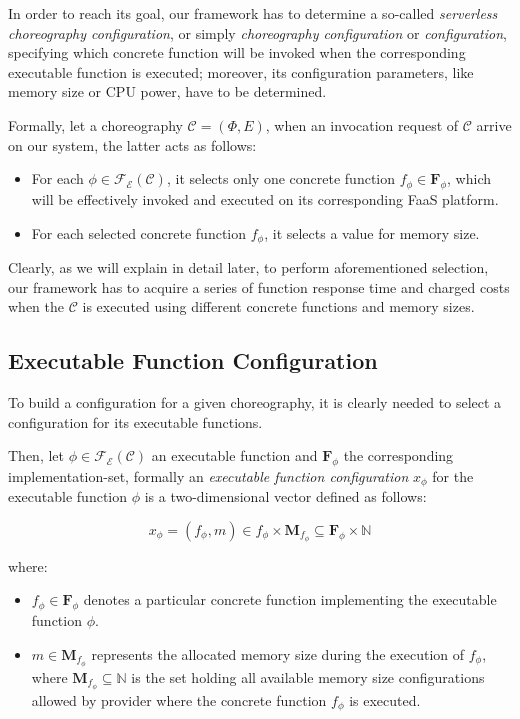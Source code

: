 \documentclass[12pt,a4paper]{report}
\newcommand{\N}{\mathbb{N}}
\begin{document}
In order to reach its goal, our framework has to determine a so-called \textit{serverless choreography configuration}, or simply \textit{choreography configuration} or \textit{configuration}, specifying which concrete function will be invoked when the corresponding executable function is executed; moreover, its configuration parameters, like memory size or CPU power, have to be determined.

Formally, let a choreography $\mathcal{C} = (\Phi,E)$, when an invocation request of $\mathcal{C}$ arrive on our system, the latter acts as follows:

\begin{itemize}
	\item For each $\phi \in \mathscr{F_E}(\mathcal{C})$, it selects only one concrete function $f_{\phi} \in \textbf{F}_{\phi}$, which will be effectively invoked and executed on its corresponding FaaS platform. 
	\item For each selected concrete function $f_{\phi}$, it selects a value for memory size.
\end{itemize}

Clearly, as we will explain in detail later, to perform aforementioned selection, our framework has to acquire a series of function response time and charged costs when the $\mathcal{C}$ is executed using different concrete functions and memory sizes.  

\subsection{Executable Function Configuration}

To build a configuration for a given choreography, it is clearly needed to select a configuration for its executable functions. 

Then, let $\phi \in \mathscr{F_E}(\mathcal{C})$ an executable function and $\textbf{F}_{\phi}$ the corresponding implementation-set, formally an \textit{executable function configuration} $x_{\phi}$ for the executable function $\phi$ is a two-dimensional vector defined as follows:

\begin{equation}
	x_{\phi} = (f_{\phi},m) \in f_{\phi} \times \textbf{M}_{f_{\phi}} \subseteq \textbf{F}_{\phi} \times \N
\end{equation}

where:

\begin{itemize}
	\item $f_{\phi} \in \textbf{F}_{\phi}$  denotes a particular concrete function implementing the executable function $\phi$.
	\item $m \in \textbf{M}_{f_{\phi}}$ represents the allocated memory size during the execution of $f_{\phi}$, where $\textbf{M}_{f_{\phi}} \subseteq \N$ is the set holding all available memory size configurations allowed by provider where the concrete function $f_{\phi}$ is executed.
\end{itemize}
\end{document}
